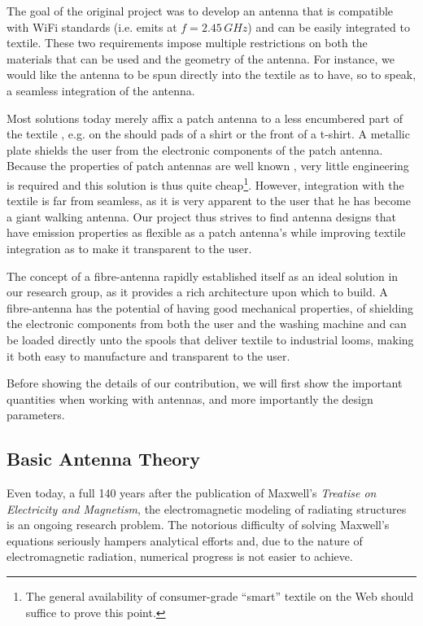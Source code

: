 The goal of the original project was to develop an antenna that is compatible with 
WiFi standards (i.e. emits at $f=2.45\,\unit{GHz}$) and can be easily integrated
to textile. These two requirements impose multiple restrictions on both
the materials that can be used and the geometry of the antenna. For instance, 
we would like the antenna to be spun directly into the textile as to have, 
so to speak, a seamless integration of the antenna.

Most solutions today merely affix a patch antenna to a less 
encumbered part of the textile \cite{CAT2004,JAI2013}, e.g. 
on the should pads of a shirt or the front of a t-shirt.
A metallic plate shields the user from the electronic components 
of the patch antenna. Because the properties of patch antennas are
well known \cite{ELL2003}, very little engineering is required and this solution
is thus quite cheap\footnote{The general availability of consumer-grade ``smart''
textile on the Web should suffice to prove this point.}. However, integration 
with the textile is far from seamless, as it is very apparent to the
user that he has become a giant walking antenna. Our project thus 
strives to find antenna designs that have emission properties
as flexible as a patch antenna's while improving textile integration
as to make it transparent to the user.

The concept of a fibre-antenna rapidly established itself
as an ideal solution in our research group, as it provides a rich
architecture upon which to build. A fibre-antenna has the potential
of having good mechanical properties, of shielding the electronic
components from both the user and the washing machine and 
can be loaded directly unto the spools that deliver textile to industrial 
looms, making it both easy to manufacture and transparent to the user.

Before showing the details of our contribution, 
we will first show the important quantities when
working with antennas, and more importantly the design
parameters.

\subsection{Basic Antenna Theory}
Even today, a full 140 years after the publication of 
Maxwell's \textit{Treatise on Electricity and Magnetism}, 
the electromagnetic modeling of radiating structures 
is an ongoing research problem. The notorious difficulty 
of solving Maxwell's equations seriously hampers analytical efforts
and, due to the nature of electromagnetic radiation, numerical
progress is not easier to achieve.

